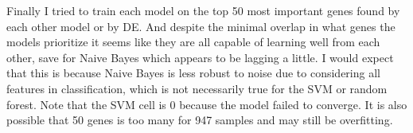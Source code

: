 \FloatBarrier
Finally I tried to train each model on the top 50 most important genes found by each other model or by DE.
And despite the minimal overlap in what genes the models prioritize it seems like they are all capable of learning well from each other, save for Naive Bayes which appears to be lagging a little.
I would expect that this is because Naive Bayes is less robust to noise due to considering all features in classification, which is not necessarily true for the SVM or random forest.
Note that the SVM cell is 0 because the model failed to converge.
It is also possible that 50 genes is too many for 947 samples and may still be overfitting.

